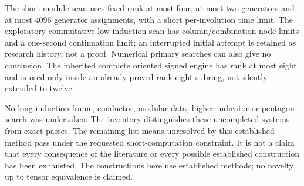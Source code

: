 \documentclass[11pt]{article}
\begin{document}
The short module scan uses fixed rank at most four, at most two generators and at most
4096 generator assignments, with a short per-involution time limit. The exploratory
commutative low-induction scan has column/combination node limits and a one-second
continuation limit; an interrupted initial attempt is retained as research history,
not a proof. Numerical primary searches can also give no conclusion. The inherited
complete oriented signed engine has rank at most eight and is used only inside an
already proved rank-eight subring, not silently extended to twelve.

No long induction-frame, conductor, modular-data, higher-indicator or pentagon search
was undertaken. The inventory distinguishes these uncompleted systems from exact
passes. The remaining list means unresolved by this established-method pass under
the requested short-computation constraint. It is not a claim that every consequence
of the literature or every possible established construction has been exhausted.
The constructions here use established methods; no novelty up to tensor equivalence
is claimed.
\end{document}

